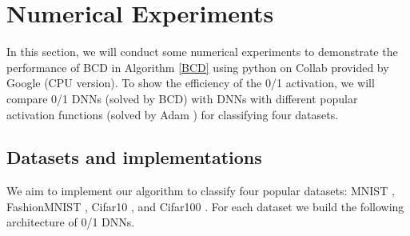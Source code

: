 \documentclass[journal]{IEEEtran}
\begin{document}
\section{Numerical Experiments} \label{Section-Numerical}
In this section, we will conduct some numerical experiments to demonstrate the performance of BCD in Algorithm \ref{BCD} using python on Collab provided by Google (CPU version). To show the efficiency of the 0/1 activation, we will compare 0/1 DNNs (solved by BCD) with DNNs with different popular activation functions (solved by Adam \cite{Kingma2014})  for classifying four datasets.
\subsection{Datasets and implementations}
We aim to implement our algorithm to classify four popular datasets: MNIST \cite{LeCun2010}, FashionMNIST \cite{Xiao2017}, { Cifar10 \cite{Krizhevsky-Nair2014}, and Cifar100 \cite{Krizhevsky-Nair2014}}. For each dataset we build the following architecture of 0/1 DNNs.
\end{document}
